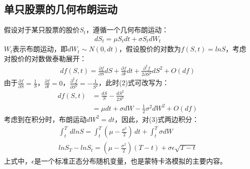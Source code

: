 \documentclass{article}
\begin{document}
    \subsection{单只股票的几何布朗运动}
    \qquad 假设对于某只股票的股价$S_t$，遵循一个几何布朗运动：
    \begin{align}
        dS_t=\mu S_tdt+\sigma S_tdW_t
    \end{align}
    \qquad $W_t$表示布朗运动，即$dW_t\sim N(0,dt)$，假设股价的对数为$f(S,t)=lnS$，考虑对股价的对数做泰勒展开：
    \begin{align}
        df(S,t)=\frac{\partial f}{\partial S}dS+\frac{\partial f}{\partial t}dt+\frac{\partial^2 f}{2\partial S^2}dS^2+O(df)
    \end{align}
    \qquad 由于$\frac{\partial f}{\partial S} = \frac{1}{S}$，$\frac{\partial f}{\partial t}=0$，$\frac{\partial^2 f}{\partial S^2}=-\frac{1}{S^2}$，此时(2)式可改写为：
    \begin{align}
        df(S,t)&=\frac{dS}{S}-\frac{dS^2}{2S^2}\nonumber\\
        &=\mu dt+\sigma dW-\frac{1}{2}\sigma^2dW^2+O(df)
    \end{align}
    \qquad 考虑到在积分时，布朗运动$dW^2=dt$，因此，对(3)式两边积分：
    \begin{gather}
        \int_{t}^{T}\,dlnS=\int_{t}^{T}(\mu-\frac{\sigma^2}{2})\,dt+\int_{t}^{T}\sigma dW\\
        lnS_T-lnS_t=(\mu-\frac{\sigma^2}{2})(T-t)+\sigma\epsilon\sqrt{T-t} 
    \end{gather}
    \qquad 上式中，$\epsilon$是一个标准正态分布随机变量，也是蒙特卡洛模拟的主要内容。
\end{document}
